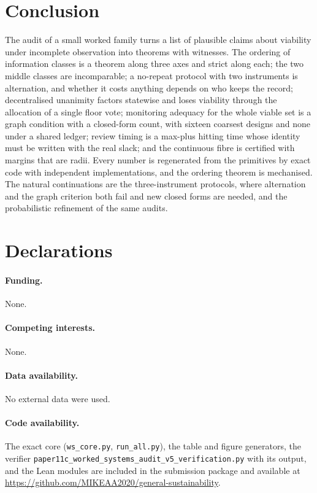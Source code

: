 \section{Conclusion}\label{sec:conclusion}

The audit of a small worked family turns a list of plausible claims about viability under incomplete observation into theorems with witnesses. The ordering of information classes is a theorem along three axes and strict along each; the two middle classes are incomparable; a no-repeat protocol with two instruments is alternation, and whether it costs anything depends on who keeps the record; decentralised unanimity factors statewise and loses viability through the allocation of a single floor vote; monitoring adequacy for the whole viable set is a graph condition with a closed-form count, with sixteen coarsest designs and none under a shared ledger; review timing is a max-plus hitting time whose identity must be written with the real slack; and the continuous fibre is certified with margins that are radii. Every number is regenerated from the primitives by exact code with independent implementations, and the ordering theorem is mechanised. The natural continuations are the three-instrument protocols, where alternation and the graph criterion both fail and new closed forms are needed, and the probabilistic refinement of the same audits.

\section*{Declarations}
\paragraph{Funding.} None.
\paragraph{Competing interests.} None.
\paragraph{Data availability.} No external data were used.
\paragraph{Code availability.} The exact core (\texttt{ws\_core.py}, \texttt{run\_all.py}), the table and figure generators, the verifier \texttt{paper11c\_worked\_systems\_audit\_v5\_verification.py} with its output, and the Lean modules are included in the submission package and available at \url{https://github.com/MIKEAA2020/general-sustainability}.
